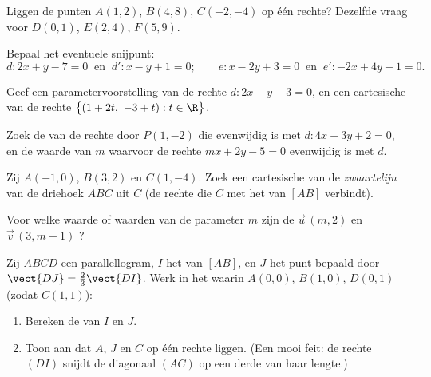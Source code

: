 \begin{exercise}[$\star\star$]\label{exo:g11:vect:5}
Liggen de punten $A(1, 2)$, $B(4, 8)$, $C(-2, -4)$ op één rechte? Dezelfde
vraag voor $D(0, 1)$, $E(2, 4)$, $F(5, 9)$.
\end{exercise}

\begin{exercise}[$\star\star$]\label{exo:g11:vect:6}
Bepaal het eventuele snijpunt:
\[
d: 2x + y - 7 = 0 \ \text{ en }\ d': x - y + 1 = 0;
\qquad
e: x - 2y + 3 = 0 \ \text{ en }\ e': -2x + 4y + 1 = 0 .
\]
\end{exercise}

\begin{exercise}[$\star\star$]\label{exo:g11:vect:7}
Geef een parametervoorstelling van de rechte $d: 2x - y + 3 = 0$, en een
cartesische  van de rechte
$\bigl\{(1 + 2t,\ -3 + t) : t \in \R\bigr\}$.
\end{exercise}

\begin{exercise}[$\star\star$]\label{exo:g11:vect:8}
Zoek de  van de rechte door $P(1, -2)$ die evenwijdig is met
$d: 4x - 3y + 2 = 0$, en de waarde van $m$ waarvoor de rechte
$mx + 2y - 5 = 0$ evenwijdig is met $d$.
\end{exercise}

\begin{exercise}[$\star\star$]\label{exo:g11:vect:9}
Zij $A(-1, 0)$, $B(3, 2)$ en $C(1, -4)$. Zoek een cartesische 
van de \emph{zwaartelijn} van de driehoek $ABC$ uit $C$ (de rechte die $C$
met het  van $[AB]$ verbindt).
\end{exercise}

\begin{exercise}[$\star\star$]\label{exo:g11:vect:10}
Voor welke waarde of waarden van de parameter $m$ zijn de 
$\vec u\,(m, 2)$ en $\vec v\,(3, m - 1)$ ?
\end{exercise}

\begin{exercise}[$\star\star\star$]\label{exo:g11:vect:11}
Zij $ABCD$ een parallellogram, $I$ het  van $[AB]$, en $J$ het punt
bepaald door $\vect{DJ} = \frac23 \vect{DI}$. Werk in het 
waarin $A(0,0)$, $B(1,0)$, $D(0,1)$ (zodat $C(1,1)$):
\begin{enumerate}
  \item Bereken de  van $I$ en $J$.
  \item Toon aan dat $A$, $J$ en $C$ op één rechte liggen. (Een mooi feit: de
        rechte $(DI)$ snijdt de diagonaal $(AC)$ op een derde van haar
        lengte.)
\end{enumerate}
\end{exercise}

